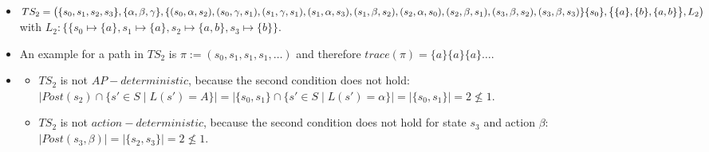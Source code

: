 \documentclass[a4paper,11pt]{scrartcl}
\begin{document}
\begin{itemize}
\begin{itemize}
			\item[(ii)] $TS_1$ is also $action-deterministic$, because both conditions hold:
			\begin{itemize}
				\item $\mid I \mid = \mid \{s_0\} \leq 1$
				\item $|Post(s_0, \alpha)| = |Post(s_0, \gamma)| = |Post(s_1, \alpha)| = |Post(s_1, \beta)|= |Post(s_1, \gamma)|= |Post(s_2, \alpha)| = |Post(s_2, \beta)| = |Post(s_4, \alpha)|= |Post(s_4, \gamma)| = 1$ and for every other pair $(s_i, \sigma)$ with $s_i \in \{s_0, s_1, s_2, s_3, s_4\}$ and $\sigma \in \{\alpha, \beta, \gamma\}$ holds $(s_i, \sigma)=0$.
			\end{itemize}
		\end{itemize}
		\item[d)] $ TS_2 = \bigl( \{s_0, s_1, s_2, s_3\}, \{\alpha,\beta, \gamma\}, \\
		\{ (s_0, \alpha, s_2), (s_0, \gamma, s_1), (s_1, \gamma, s_1), (s_1, \alpha, s_3), (s_1, \beta, s_2), (s_2, \alpha, s_0), (s_2, \beta, s_1), (s_3, \beta, s_2), (s_3, \beta, s_3) \}\\
		\{s_0\}, \bigl\{ \{a\}, \{b\}, \{a,b\} \bigr\}, L_2 \bigr)$\\
		with $L_2: \bigl\{ \{s_0 \mapsto \{a\}, s_1 \mapsto \{a\}, s_2 \mapsto \{a,b\}, s_3 \mapsto \{b\}\bigr\}$.
		\item[e)] An example for a path in $TS_2$ is $\pi := (s_0, s_1, s_1, s_1, \dots)$ and therefore $trace(\pi)=\{a\}\{a\}\{a\}\dots$.
		\item[f)]
		\begin{itemize}
			\item[(i)] $TS_2$ is not $AP-deterministic$, because the second condition does not hold: $| Post(s_2) \cap \{s' \in S \mid L(s')=A\} |= |\{s_0, s_1\} \cap \{s' \in S \mid L(s')=\alpha\}|= |\{s_0, s_1\}| = 2 \nleq 1$.
			\item[(ii)] $TS_2$ is not $action-deterministic$, because the second condition does not hold for state $s_3$ and action $\beta$: $|Post(s_3, \beta)| = |\{ s_2, s_3\}| = 2 \nleq 1$.
		\end{itemize}
	\end{itemize}

	
\end{document}

